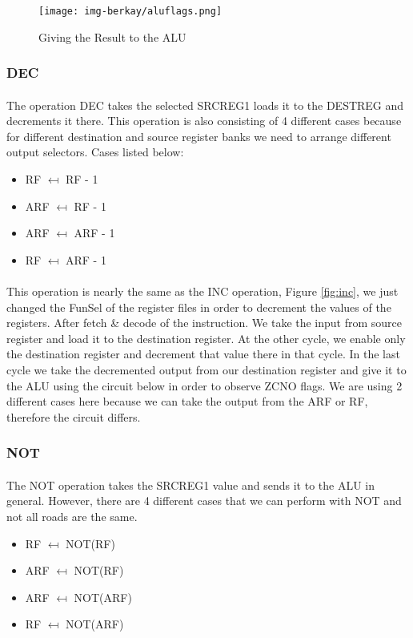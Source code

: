 \documentclass{article}
\begin{document}
\begin{figure}[h]
    \centering
    \texttt{[image: img-berkay/aluflags.png]}
    \caption{Giving the Result to the ALU}
    \label{fig:my_label}
\end{figure}


\newpage
\subsubsection{DEC}
\paragraph{}
The operation DEC takes the selected SRCREG1 loads it to the DESTREG and decrements it there. This operation is also consisting of 4 different cases because for different destination and source register banks we need to arrange different output selectors. Cases listed below:
\begin{itemize}
    \item RF $\mapsfrom$ RF - 1
    \item ARF $\mapsfrom$ RF - 1
    \item ARF $\mapsfrom$ ARF - 1
    \item RF $\mapsfrom$ ARF - 1
\end{itemize}

\paragraph{}
This operation is nearly the same as the INC operation, Figure \ref{fig:inc}, we just changed the FunSel of the register files in order to decrement the values of the registers. 
After fetch \& decode of the instruction. We take the input from source register and load it to the destination register. At the other cycle, we enable only the destination register and decrement that value there in that cycle. In the last cycle we take the decremented output from our destination register and give it to the ALU using the circuit below in order to observe ZCNO flags. We are using 2 different cases here because we can take the output from the ARF or RF, therefore the circuit  differs.
\newpage
\subsubsection{NOT}
\paragraph{}
The NOT operation takes the SRCREG1 value and sends it to the ALU in general. However, there are 4 different cases that we can perform with NOT and not all  roads are the same.
\begin{itemize}
    \item RF $\mapsfrom$ NOT(RF)
    \item ARF $\mapsfrom$ NOT(RF)
    \item ARF $\mapsfrom$ NOT(ARF)
    \item RF $\mapsfrom$ NOT(ARF)
\end{itemize}
\end{document}
